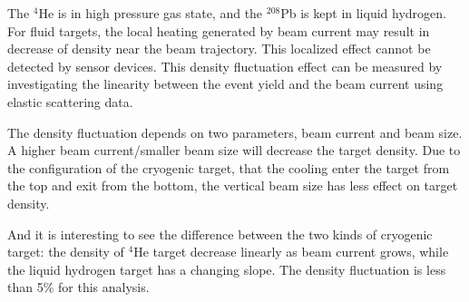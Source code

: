 The $^{4}$He is in high pressure gas state, and the $^{208}$Pb is
kept in liquid hydrogen. For fluid targets, the local heating generated
by beam current may result in decrease of density near the beam trajectory. 
This localized effect cannot be detected by sensor devices.
This density fluctuation effect can be measured by investigating the 
linearity between the event yield and the beam current using elastic
scattering data.

The density fluctuation depends on two parameters, beam current and beam
size. A higher beam current/smaller beam size will decrease the target
density.  Due to the configuration of the cryogenic target, that the 
cooling enter the target from the top and exit from the bottom, the 
vertical beam size has less effect on target density.

And it is interesting to see the difference between the two kinds of
cryogenic target: the density of $^{4}$He target decrease linearly as
beam current grows, while the liquid hydrogen target has a changing 
slope. The density fluctuation is less than 5\% for this analysis.






